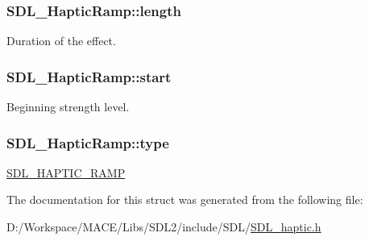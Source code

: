 \subsubsection[{\texorpdfstring{length}{length}}]{ S\+D\+L\+\_\+\+Haptic\+Ramp\+::length}\hypertarget{struct_s_d_l___haptic_ramp_a57e75237507701405af2a3caf34cdb5a}{}\label{struct_s_d_l___haptic_ramp_a57e75237507701405af2a3caf34cdb5a}
Duration of the effect. 
\subsubsection[{\texorpdfstring{start}{start}}]{ S\+D\+L\+\_\+\+Haptic\+Ramp\+::start}\hypertarget{struct_s_d_l___haptic_ramp_acc0e813ac6399290fd4a788d2471e8d4}{}\label{struct_s_d_l___haptic_ramp_acc0e813ac6399290fd4a788d2471e8d4}
Beginning strength level. 
\subsubsection[{\texorpdfstring{type}{type}}]{ S\+D\+L\+\_\+\+Haptic\+Ramp\+::type}\hypertarget{struct_s_d_l___haptic_ramp_aca1c2349372433822ab62f60976640aa}{}\label{struct_s_d_l___haptic_ramp_aca1c2349372433822ab62f60976640aa}
\hyperlink{_s_d_l__haptic_8h_af10eb937a64a8f602e9c46682ac0d868}{S\+D\+L\+\_\+\+H\+A\+P\+T\+I\+C\+\_\+\+R\+A\+MP} 

The documentation for this struct was generated from the following file\+:\begin{DoxyCompactItemize}
\item 
D\+:/\+Workspace/\+M\+A\+C\+E/\+Libs/\+S\+D\+L2/include/\+S\+D\+L/\hyperlink{_s_d_l__haptic_8h}{S\+D\+L\+\_\+haptic.\+h}\end{DoxyCompactItemize}
